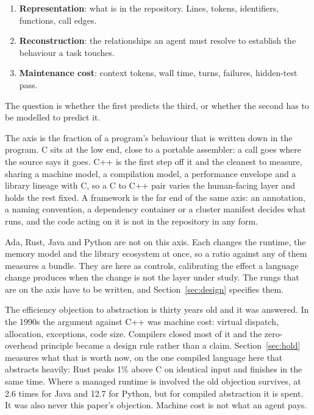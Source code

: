 \documentclass[11pt,a4paper]{article}
\begin{document}
\begin{enumerate}[nosep]
\item \textbf{Representation}: what is in the repository. Lines, tokens, identifiers, functions, call edges.
\item \textbf{Reconstruction}: the relationships an agent must resolve to establish the behaviour a task touches.
\item \textbf{Maintenance cost}: context tokens, wall time, turns, failures, hidden-test pass.
\end{enumerate}

The question is whether the first predicts the third, or whether the second has to be modelled to predict it.

The axis is the fraction of a program's behaviour that is written down in the program. C sits at the low end, close to a portable assembler: a call goes where the source says it goes. C++ is the first step off it and the cleanest to measure, sharing a machine model, a compilation model, a performance envelope and a library lineage with C, so a C to C++ pair varies the human-facing layer and holds the rest fixed. A framework is the far end of the same axis: an annotation, a naming convention, a dependency container or a cluster manifest decides what runs, and the code acting on it is not in the repository in any form.

Ada, Rust, Java and Python are not on this axis. Each changes the runtime, the memory model and the library ecosystem at once, so a ratio against any of them measures a bundle. They are here as controls, calibrating the effect a language change produces when the change is not the layer under study. The rungs that are on the axis have to be written, and Section~\ref{sec:design} specifies them.

The efficiency objection to abstraction is thirty years old and it was answered. In the 1990s the argument against C++ was machine cost: virtual dispatch, allocation, exceptions, code size. Compilers closed most of it and the zero-overhead principle became a design rule rather than a claim. Section~\ref{sec:hold} measures what that is worth now, on the one compiled language here that abstracts heavily: Rust peaks 1\% above C on identical input and finishes in the same time. Where a managed runtime is involved the old objection survives, at 2.6 times for Java and 12.7 for Python, but for compiled abstraction it is spent. It was also never this paper's objection. Machine cost is not what an agent pays.
\end{document}
